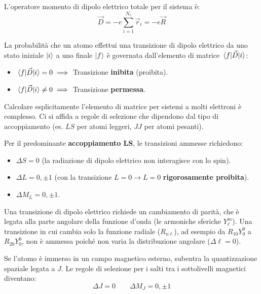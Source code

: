L'operatore momento di dipolo elettrico totale per il sistema è:
\begin{equation}
    \vec{D} = -e \sum_{i=1}^{N_e} \vec{r}_i = -e\vec{R}
\end{equation}

La probabilità che un atomo effettui una transizione di dipolo elettrico da uno stato iniziale \(\ket{i}\) a uno finale \(\ket{f}\) è governata dall'elemento di matrice \(\mel{f}{\vec{D}}{i}\):
\begin{itemize}
    \item \(\mel{f}{\vec{D}}{i} = 0 \implies\) Transizione \textbf{inibita} (proibita).
    \item \(\mel{f}{\vec{D}}{i} \neq 0 \implies\) Transizione \textbf{permessa}.
\end{itemize}

Calcolare esplicitamente l'elemento di matrice per sistemi a molti elettroni è complesso. Ci si affida a regole di selezione che dipendono dal tipo di accoppiamento (es. \(LS\) per atomi leggeri, \(JJ\) per atomi pesanti).

Per il predominante \textbf{accoppiamento LS}, le transizioni ammesse richiedono:
\begin{itemize}
    \item \(\Delta S = 0\) (la radiazione di dipolo elettrico non interagisce con lo spin).
    \item \(\Delta L = 0, \pm 1\) (con la transizione \(L=0 \to L=0\) \textbf{rigorosamente proibita}).
    \item \(\Delta M_L = 0, \pm 1\).
\end{itemize}

\begin{remark}
    Una transizione di dipolo elettrico richiede un cambiamento di parità, che è legata alla parte angolare della funzione d'onda (le armoniche sferiche \(Y_\ell^m\)). Una transizione in cui cambia solo la funzione radiale (\(R_{n\ell}\)), ad esempio da \(R_{10}Y_0^0\) a \(R_{20}Y_0^0\), non è ammessa poiché non varia la distribuzione angolare (\(\Delta \ell = 0\)).
\end{remark}

Se l'atomo è immerso in un campo magnetico esterno, subentra la quantizzazione spaziale legata a \(J\). Le regole di selezione per i salti tra i sottolivelli magnetici diventano:
\begin{equation}
    \Delta J = 0 \qquad \Delta M_J = 0, \pm 1
\end{equation}

